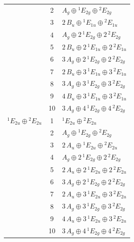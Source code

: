 \documentclass[11pt]{article}
\begin{document}
\begin{longtable}{l c p{}}
 & 2 & $A_{g}\oplus {}^{1}E_{2g}\oplus {}^{2}E_{2g}$\\
 & 3 & $2\,B_{u}\oplus {}^{1}E_{1u}\oplus {}^{2}E_{1u}$\\
 & 4 & $A_{g}\oplus 2\,{}^{1}E_{2g}\oplus 2\,{}^{2}E_{2g}$\\
 & 5 & $2\,B_{u}\oplus 2\,{}^{1}E_{1u}\oplus 2\,{}^{2}E_{1u}$\\
 & 6 & $3\,A_{g}\oplus 2\,{}^{1}E_{2g}\oplus 2\,{}^{2}E_{2g}$\\
 & 7 & $2\,B_{u}\oplus 3\,{}^{1}E_{1u}\oplus 3\,{}^{2}E_{1u}$\\
 & 8 & $3\,A_{g}\oplus 3\,{}^{1}E_{2g}\oplus 3\,{}^{2}E_{2g}$\\
 & 9 & $4\,B_{u}\oplus 3\,{}^{1}E_{1u}\oplus 3\,{}^{2}E_{1u}$\\
 & 10 & $3\,A_{g}\oplus 4\,{}^{1}E_{2g}\oplus 4\,{}^{2}E_{2g}$\\
\hline
${}^{1}E_{2u}\oplus {}^{2}E_{2u}$ & 1 & ${}^{1}E_{2u}\oplus {}^{2}E_{2u}$\\
 & 2 & $A_{g}\oplus {}^{1}E_{2g}\oplus {}^{2}E_{2g}$\\
 & 3 & $2\,A_{u}\oplus {}^{1}E_{2u}\oplus {}^{2}E_{2u}$\\
 & 4 & $A_{g}\oplus 2\,{}^{1}E_{2g}\oplus 2\,{}^{2}E_{2g}$\\
 & 5 & $2\,A_{u}\oplus 2\,{}^{1}E_{2u}\oplus 2\,{}^{2}E_{2u}$\\
 & 6 & $3\,A_{g}\oplus 2\,{}^{1}E_{2g}\oplus 2\,{}^{2}E_{2g}$\\
 & 7 & $2\,A_{u}\oplus 3\,{}^{1}E_{2u}\oplus 3\,{}^{2}E_{2u}$\\
 & 8 & $3\,A_{g}\oplus 3\,{}^{1}E_{2g}\oplus 3\,{}^{2}E_{2g}$\\
 & 9 & $4\,A_{u}\oplus 3\,{}^{1}E_{2u}\oplus 3\,{}^{2}E_{2u}$\\
 & 10 & $3\,A_{g}\oplus 4\,{}^{1}E_{2g}\oplus 4\,{}^{2}E_{2g}$\\
\hline
\end{longtable}
\end{document}
